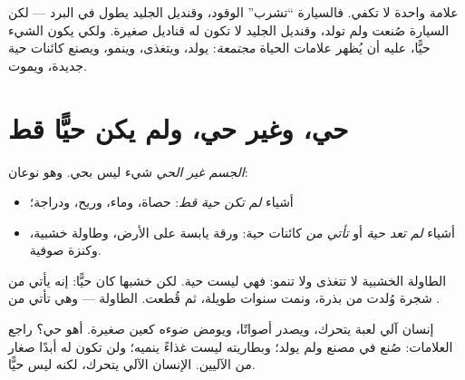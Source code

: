 \begin{remark}\label{rem:g1:living-or-not:allsigns}
علامة واحدة لا تكفي. فالسيارة ``تشرب'' الوقود، وقنديل الجليد يطول
في البرد --- لكن السيارة صُنعت ولم تولد، وقنديل الجليد لا تكون له
قناديل صغيرة. ولكي يكون الشيء حيًّا، عليه أن يُظهر علامات الحياة
\emph{مجتمعة}: يولد، ويتغذى، وينمو، ويصنع كائنات حية جديدة، ويموت.
\end{remark}

\section{حي، وغير حي، ولم يكن حيًّا قط}

\begin{definition}\label{def:g1:living-or-not:nonliving}
\emph{الجسم غير الحي} شيء ليس بحي. وهو نوعان:
\begin{itemize}
  \item أشياء \emph{لم تكن حية قط}: حصاة،
        وماء، وريح، ودراجة؛
  \item أشياء \emph{لم تعد حية} أو \emph{تأتي
        من} كائنات حية: ورقة يابسة على الأرض، وطاولة خشبية، وكنزة
        صوفية.
\end{itemize}
\end{definition}

\begin{example}\label{ex:g1:living-or-not:table}
الطاولة الخشبية لا تتغذى ولا تنمو: فهي ليست حية. لكن خشبها كان
حيًّا: إنه يأتي من شجرة وُلدت من بذرة، ونمت سنوات طويلة، ثم قُطعت.
الطاولة  --- وهي تأتي من .
\end{example}

\begin{example}\label{ex:g1:living-or-not:robot}
إنسان آلي لعبة يتحرك، ويصدر أصواتًا، ويومض ضوءه كعين صغيرة. أهو
حي؟ راجع العلامات: صُنع في مصنع ولم يولد؛ وبطاريته ليست غذاءً
ينميه؛ ولن تكون له أبدًا صغار من الآليين. الإنسان الآلي يتحرك،
لكنه ليس حيًّا.
\end{example}

